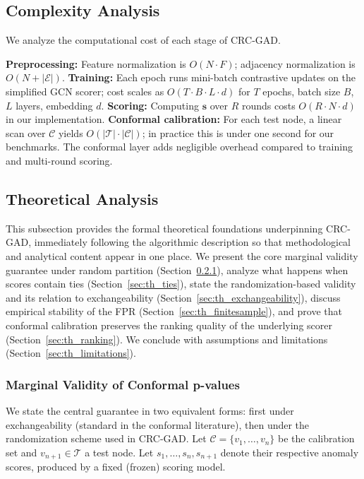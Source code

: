 \documentclass[a4paper]{cas-dc}
\theoremstyle{definition}
\begin{document}
\subsection{Complexity Analysis}
\label{sec:meth_complexity}

We analyze the computational cost of each stage of CRC-GAD. 

\textbf{Preprocessing:} Feature normalization is $O(N \cdot F)$; adjacency normalization is $O(N + |\mathcal{E}|)$. \textbf{Training:} Each epoch runs mini-batch contrastive updates on the simplified GCN scorer; cost scales as $O(T \cdot B \cdot L \cdot d)$ for $T$ epochs, batch size $B$, $L$ layers, embedding $d$. \textbf{Scoring:} Computing $\mathbf{s}$ over $R$ rounds costs $O(R \cdot N \cdot d)$ in our implementation. \textbf{Conformal calibration:} For each test node, a linear scan over $\mathcal{C}$ yields $O(|\mathcal{T}| \cdot |\mathcal{C}|)$; in practice this is under one second for our benchmarks. The conformal layer adds negligible overhead compared to training and multi-round scoring.

\subsection{Theoretical Analysis}
\label{sec:theory}

This subsection provides the formal theoretical foundations underpinning CRC-GAD, immediately following the algorithmic description so that methodological and analytical content appear in one place. We present the core marginal validity guarantee under random partition (Section~\ref{sec:th_validity}), analyze what happens when scores contain ties (Section~\ref{sec:th_ties}), state the randomization-based validity and its relation to exchangeability (Section~\ref{sec:th_exchangeability}), discuss empirical stability of the FPR (Section~\ref{sec:th_finitesample}), and prove that conformal calibration preserves the ranking quality of the underlying scorer (Section~\ref{sec:th_ranking}).  We conclude with assumptions and limitations (Section~\ref{sec:th_limitations}).
\subsubsection{Marginal Validity of Conformal p-values}
\label{sec:th_validity}

We state the central guarantee in two equivalent forms: first under exchangeability (standard in the conformal literature), then under the randomization scheme used in CRC-GAD.  Let $\mathcal{C} = \{v_1, \ldots, v_n\}$ be the calibration set and $v_{n+1} \in \mathcal{T}$ a test node.  Let $s_1, \ldots, s_n, s_{n+1}$ denote their respective anomaly scores, produced by a fixed (frozen) scoring model.
\end{document}
